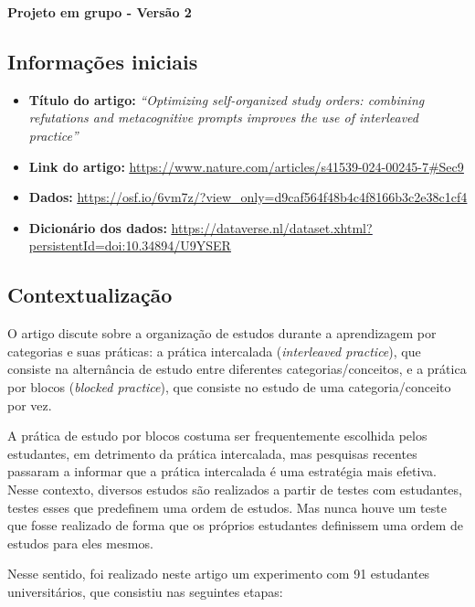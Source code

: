 \documentclass[
]{article}
\author{}
\date{\vspace{-2.5em}}
\begin{document}
\begin{center}
    {\LARGE \bfseries Projeto em grupo - Versão 2}
    
\end{center}

\subsection{Informações iniciais}\label{informauxe7uxf5es-iniciais}

\begin{itemize}
\item
  \textbf{Título do artigo:} \emph{``Optimizing self-organized study
  orders: combining refutations and metacognitive prompts improves the
  use of interleaved practice''}
\item
  \textbf{Link do artigo:}
  \textcolor{blue}{\underline{\url{https://www.nature.com/articles/s41539-024-00245-7\#Sec9}}}
\item
  \textbf{Dados:}
  \textcolor{blue}{\underline{\url{https://osf.io/6vm7z/?view_only=d9caf564f48b4c4f8166b3c2e38c1cf4}}}
\item
  \textbf{Dicionário dos dados:}
  \textcolor{blue}{\underline{\url{https://dataverse.nl/dataset.xhtml?persistentId=doi:10.34894/U9YSER}}}
\end{itemize}

\subsection{Contextualização}\label{contextualizauxe7uxe3o}

O artigo discute sobre a organização de estudos durante a aprendizagem
por categorias e suas práticas: a prática intercalada (\emph{interleaved
practice}), que consiste na alternância de estudo entre diferentes
categorias/conceitos, e a prática por blocos (\emph{blocked practice}),
que consiste no estudo de uma categoria/conceito por vez.

A prática de estudo por blocos costuma ser frequentemente escolhida
pelos estudantes, em detrimento da prática intercalada, mas pesquisas
recentes passaram a informar que a prática intercalada é uma estratégia
mais efetiva. Nesse contexto, diversos estudos são realizados a partir
de testes com estudantes, testes esses que predefinem uma ordem de
estudos. Mas nunca houve um teste que fosse realizado de forma que os
próprios estudantes definissem uma ordem de estudos para eles mesmos.

Nesse sentido, foi realizado neste artigo um experimento com 91
estudantes universitários, que consistiu nas seguintes etapas:
\end{document}
